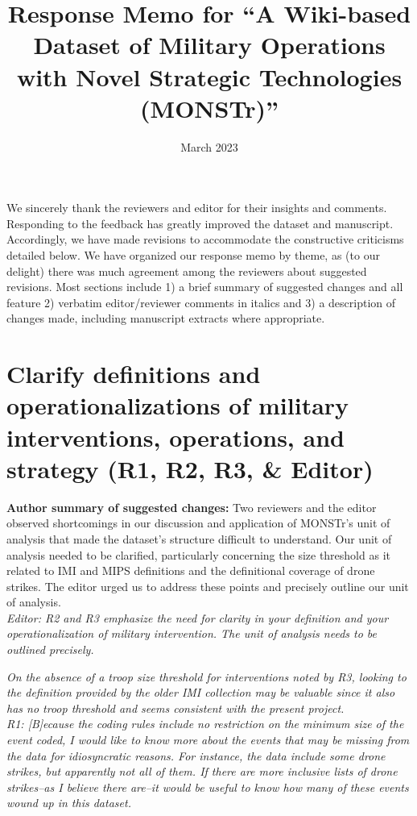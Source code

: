\documentclass[fleqn,12pt]{article}
\title{Response Memo for ``A Wiki-based Dataset of Military Operations with Novel Strategic Technologies (MONSTr)''}
\date{March 2023}
\begin{document}
\thispagestyle{empty}
\setcounter{page}{0}

\maketitle

We sincerely thank the reviewers and editor for their insights and comments. Responding to the feedback has greatly improved the dataset and manuscript. Accordingly, we have made revisions to accommodate the constructive criticisms detailed below. We have organized our response memo by theme, as (to our delight) there was much agreement among the reviewers about suggested revisions. Most sections include 1) a brief summary of suggested changes and all feature 2) verbatim editor/reviewer comments in italics and 3) a description of changes made, including manuscript extracts where appropriate.

\tableofcontents

\clearpage

\section{Clarify definitions and operationalizations of military interventions, operations, and strategy (R1, R2, R3, \& Editor)}

\noindent \textbf{Author summary of suggested changes:} Two reviewers and the editor observed shortcomings in our discussion and application of MONSTr's unit of analysis that made the dataset's structure difficult to understand. Our unit of analysis needed to be clarified, particularly concerning the size threshold as it related to IMI and MIPS definitions and the definitional coverage of drone strikes. The editor urged us to address these points and precisely outline our unit of analysis. \\

\noindent
\textit{Editor: R2 and R3 emphasize the need for clarity in your definition and your operationalization of military intervention. The unit of analysis needs to be outlined precisely.}

\textit{On the absence of a troop size threshold for interventions noted by R3, looking to the definition provided by the older IMI collection may be valuable since it also has no troop threshold and seems consistent with the present project.} \\

\noindent
\textit{R1: [B]ecause the coding rules include no restriction on the minimum size of the event coded, I would like to know more about the events that may be missing from the data for idiosyncratic reasons. For instance, the data include some drone strikes, but apparently not all of them. If there are more inclusive lists of drone strikes--as I believe there are--it would be useful to know how many of these events wound up in this dataset.} \\
\end{document}
